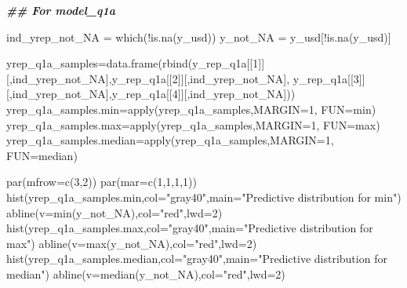\documentclass[
]{article}
\newenvironment{Shaded}{\begin{snugshade}}{\end{snugshade}}
\newcommand{\AttributeTok}[1]{\textcolor[rgb]{0.77,0.63,0.00}{#1}}
\newcommand{\DecValTok}[1]{\textcolor[rgb]{0.00,0.00,0.81}{#1}}
\newcommand{\DocumentationTok}[1]{\textcolor[rgb]{0.56,0.35,0.01}{\textbf{\textit{#1}}}}
\newcommand{\FunctionTok}[1]{\textcolor[rgb]{0.00,0.00,0.00}{#1}}
\newcommand{\NormalTok}[1]{#1}
\newcommand{\OtherTok}[1]{\textcolor[rgb]{0.56,0.35,0.01}{#1}}
\newcommand{\SpecialCharTok}[1]{\textcolor[rgb]{0.00,0.00,0.00}{#1}}
\newcommand{\StringTok}[1]{\textcolor[rgb]{0.31,0.60,0.02}{#1}}
\begin{document}
\begin{Shaded}
\begin{Highlighting}[]
\DocumentationTok{\#\# For model\_q1a}

\NormalTok{ind\_yrep\_not\_NA }\OtherTok{=} \FunctionTok{which}\NormalTok{(}\SpecialCharTok{!}\FunctionTok{is.na}\NormalTok{(y\_usd))}
\NormalTok{y\_not\_NA }\OtherTok{=}\NormalTok{ y\_usd[}\SpecialCharTok{!}\FunctionTok{is.na}\NormalTok{(y\_usd)]}


\NormalTok{yrep\_q1a\_samples}\OtherTok{=}\FunctionTok{data.frame}\NormalTok{(}\FunctionTok{rbind}\NormalTok{(y\_rep\_q1a[[}\DecValTok{1}\NormalTok{]][,ind\_yrep\_not\_NA],y\_rep\_q1a[[}\DecValTok{2}\NormalTok{]][,ind\_yrep\_not\_NA],}
\NormalTok{                              y\_rep\_q1a[[}\DecValTok{3}\NormalTok{]][,ind\_yrep\_not\_NA],y\_rep\_q1a[[}\DecValTok{4}\NormalTok{]][,ind\_yrep\_not\_NA]))}
\NormalTok{yrep\_q1a\_samples.min}\OtherTok{=}\FunctionTok{apply}\NormalTok{(yrep\_q1a\_samples,}\AttributeTok{MARGIN=}\DecValTok{1}\NormalTok{, }\AttributeTok{FUN=}\NormalTok{min)}
\NormalTok{yrep\_q1a\_samples.max}\OtherTok{=}\FunctionTok{apply}\NormalTok{(yrep\_q1a\_samples,}\AttributeTok{MARGIN=}\DecValTok{1}\NormalTok{, }\AttributeTok{FUN=}\NormalTok{max)}
\NormalTok{yrep\_q1a\_samples.median}\OtherTok{=}\FunctionTok{apply}\NormalTok{(yrep\_q1a\_samples,}\AttributeTok{MARGIN=}\DecValTok{1}\NormalTok{, }\AttributeTok{FUN=}\NormalTok{median)}

\FunctionTok{par}\NormalTok{(}\AttributeTok{mfrow=}\FunctionTok{c}\NormalTok{(}\DecValTok{3}\NormalTok{,}\DecValTok{2}\NormalTok{))}
\FunctionTok{par}\NormalTok{(}\AttributeTok{mar=}\FunctionTok{c}\NormalTok{(}\DecValTok{1}\NormalTok{,}\DecValTok{1}\NormalTok{,}\DecValTok{1}\NormalTok{,}\DecValTok{1}\NormalTok{))}
\FunctionTok{hist}\NormalTok{(yrep\_q1a\_samples.min,}\AttributeTok{col=}\StringTok{"gray40"}\NormalTok{,}\AttributeTok{main=}\StringTok{"Predictive distribution for min"}\NormalTok{)}
\FunctionTok{abline}\NormalTok{(}\AttributeTok{v=}\FunctionTok{min}\NormalTok{(y\_not\_NA),}\AttributeTok{col=}\StringTok{"red"}\NormalTok{,}\AttributeTok{lwd=}\DecValTok{2}\NormalTok{)}
\FunctionTok{hist}\NormalTok{(yrep\_q1a\_samples.max,}\AttributeTok{col=}\StringTok{"gray40"}\NormalTok{,}\AttributeTok{main=}\StringTok{"Predictive distribution for max"}\NormalTok{)}
\FunctionTok{abline}\NormalTok{(}\AttributeTok{v=}\FunctionTok{max}\NormalTok{(y\_not\_NA),}\AttributeTok{col=}\StringTok{"red"}\NormalTok{,}\AttributeTok{lwd=}\DecValTok{2}\NormalTok{)}
\FunctionTok{hist}\NormalTok{(yrep\_q1a\_samples.median,}\AttributeTok{col=}\StringTok{"gray40"}\NormalTok{,}\AttributeTok{main=}\StringTok{"Predictive distribution for median"}\NormalTok{)}
\FunctionTok{abline}\NormalTok{(}\AttributeTok{v=}\FunctionTok{median}\NormalTok{(y\_not\_NA),}\AttributeTok{col=}\StringTok{"red"}\NormalTok{,}\AttributeTok{lwd=}\DecValTok{2}\NormalTok{)}
\end{Highlighting}
\end{Shaded}
\end{document}
